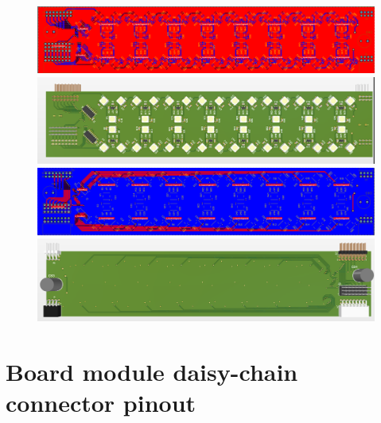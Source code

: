 \documentclass{article}
\begin{document}
\begin{appendices}
	\begin{figure}[H]
		\includegraphics[width=\textwidth]{appendix/pcb_top.png}
		\includegraphics[width=\textwidth]{appendix/pcb_3d_top.png}
		\includegraphics[width=\textwidth]{appendix/pcb_bot.png}
		\includegraphics[width=\textwidth]{appendix/pcb_3d_bot.png}
	\end{figure}

	\newpage

	\section{Board module daisy-chain connector pinout}

	\begin{figure}[H]
		
	\end{figure}
\end{appendices}
\end{document}
